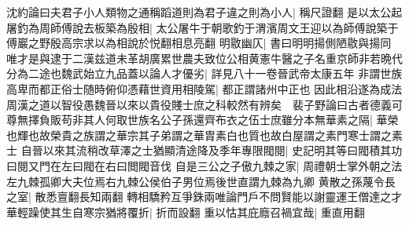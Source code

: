 沈約論曰夫君子小人類物之通稱蹈道則為君子違之則為小人|{
	稱尺證翻}
是以太公起屠釣為周師傅說去板築為殷相|{
	太公屠牛于朝歌釣于渭濱周文王迎以為師傅說築于傅巖之野殷高宗求以為相說於悦翻相息亮翻}
明敭幽仄|{
	書曰明明揚側陋敭與揚同}
唯才是與逮于二漢兹道未革胡廣累世農夫致位公相黄憲牛醫之子名重京師非若晩代分為二途也魏武始立九品蓋以論人才優劣|{
	詳見八十一卷晉武帝太康五年}
非謂世族高卑而都正俗士随時俯仰憑藉世資用相陵駕|{
	都正謂諸州中正也}
因此相沿遂為成法周漢之道以智役愚魏晉以來以貴役賤士庶之科較然有辨矣　裴子野論曰古者德義可尊無擇負販苟非其人何取世族名公子孫還齊布衣之伍士庶雖分本無華素之隔|{
	華榮也輝也故榮貴之族謂之華宗其子弟謂之華胄素白也質也故白屋謂之素門寒士謂之素士}
自晉以來其流稍改草澤之士猶顯清途降及季年專限閥閱|{
	史記明其等曰閥積其功曰閱又門在左曰閥在右曰閲閥音伐}
自是三公之子傲九棘之家|{
	周禮朝士掌外朝之法左九棘孤卿大夫位焉右九棘公侯伯子男位焉後世直謂九棘為九卿}
黄散之孫蔑令長之室|{
	散悉亶翻長知兩翻}
轉相驕矜互爭銖兩唯論門戶不問賢能以謝靈運王僧達之才華輕躁使其生自寒宗猶將覆折|{
	折而設翻}
重以怙其庇廕召禍宜哉|{
	重直用翻}


